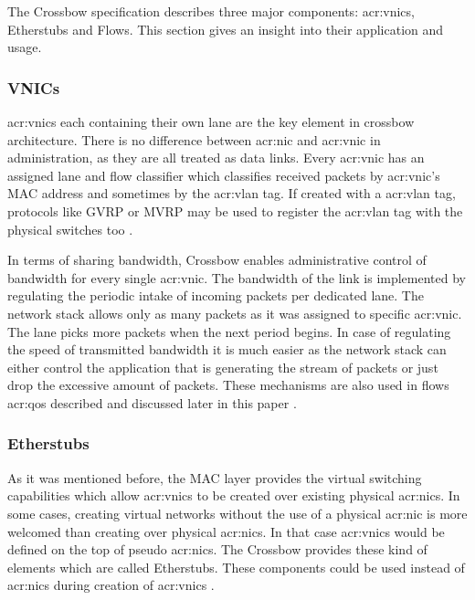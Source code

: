 \documentclass[11pt]{book}
\begin{document}
        The Crossbow specification describes three major components: \gls{acr:vnic}s, Etherstubs and Flows. This section
        gives an insight into their application and usage.

                
        \subsubsection{VNICs}
        
          \gls{acr:vnic}s each containing their own lane are the key element in crossbow architecture. There is no
          difference between \gls{acr:nic} and \gls{acr:vnic} in administration, as they are all treated as data links.
          Every \gls{acr:vnic} has an assigned lane and flow classifier which classifies received packets by
          \gls{acr:vnic}'s MAC address and sometimes by the \gls{acr:vlan} tag.  If created with a \gls{acr:vlan} tag,
          protocols like GVRP or MVRP may be used to register the \gls{acr:vlan} tag with the physical switches too
          \cite{crossbow}.	

          In terms of sharing bandwidth, Crossbow enables administrative control of bandwidth for every single
          \gls{acr:vnic}. The bandwidth of the link is implemented by regulating the periodic intake of incoming packets
          per dedicated lane.  The network stack allows only as many packets as it was assigned to specific
          \gls{acr:vnic}. The lane picks more packets when the next period begins. In case of regulating the speed of
          transmitted bandwidth it is much easier as the network stack can either control the application that is
          generating the stream of packets or just drop the excessive amount of packets.  These mechanisms are also used
          in flows \gls{acr:qos} described and discussed later in this paper \cite{crossbow}.


        \subsubsection{Etherstubs}

          As it was mentioned before, the MAC layer provides the virtual switching capabilities which allow
          \gls{acr:vnic}s to be created over existing physical \gls{acr:nic}s.  In some cases, creating virtual networks
          without the use of a physical \gls{acr:nic} is more welcomed than creating over physical \gls{acr:nic}s. In
          that case \gls{acr:vnic}s would be defined on the top of pseudo \gls{acr:nic}s.  The Crossbow provides these
          kind of elements which are called Etherstubs. These components could be used instead of \gls{acr:nic}s during
          creation of \gls{acr:vnic}s \cite{crossbow}.
\end{document}
